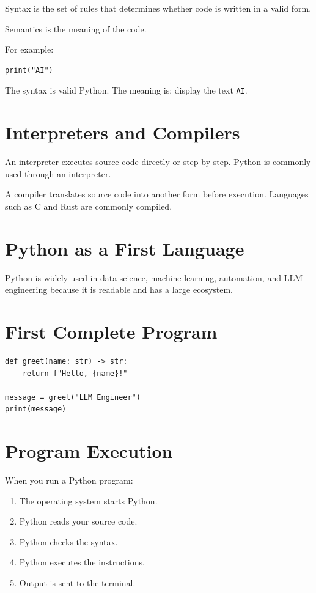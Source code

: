 \begin{definition}
Syntax is the set of rules that determines whether code is written in a valid form.
\end{definition}

\begin{definition}
Semantics is the meaning of the code.
\end{definition}

For example:

\begin{lstlisting}
print("AI")
\end{lstlisting}

The syntax is valid Python. The meaning is: display the text \texttt{AI}.

\section{Interpreters and Compilers}

An interpreter executes source code directly or step by step. Python is commonly used through an interpreter.

A compiler translates source code into another form before execution. Languages such as C and Rust are commonly compiled.

\section{Python as a First Language}

Python is widely used in data science, machine learning, automation, and LLM engineering because it is readable and has a large ecosystem.

\section{First Complete Program}

\begin{lstlisting}
def greet(name: str) -> str:
    return f"Hello, {name}!"

message = greet("LLM Engineer")
print(message)
\end{lstlisting}

\section{Program Execution}

When you run a Python program:

\begin{enumerate}
    \item The operating system starts Python.
    \item Python reads your source code.
    \item Python checks the syntax.
    \item Python executes the instructions.
    \item Output is sent to the terminal.
\end{enumerate}

